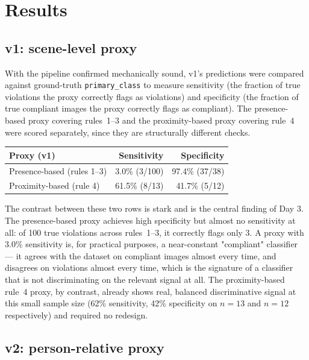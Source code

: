 \section{Results}

\subsection{v1: scene-level proxy}

With the pipeline confirmed mechanically sound, v1's predictions were compared against ground-truth
\texttt{primary\_class} to measure sensitivity (the fraction of true violations the proxy correctly
flags as violations) and specificity (the fraction of true compliant images the proxy correctly
flags as compliant). The presence-based proxy covering rules~1--3 and the proximity-based proxy
covering rule~4 were scored separately, since they are structurally different checks.

\begin{center}
\begin{tabular}{lrr}
\toprule
\textbf{Proxy (v1)} & \textbf{Sensitivity} & \textbf{Specificity} \\
\midrule
Presence-based (rules 1--3) & 3.0\% (3/100) & 97.4\% (37/38) \\
Proximity-based (rule 4) & 61.5\% (8/13) & 41.7\% (5/12) \\
\bottomrule
\end{tabular}
\end{center}

The contrast between these two rows is stark and is the central finding of Day 3. The
presence-based proxy achieves high specificity but almost no sensitivity at all: of 100 true
violations across rules~1--3, it correctly flags only 3. A proxy with 3.0\% sensitivity is, for
practical purposes, a near-constant "compliant" classifier --- it agrees with the dataset on
compliant images almost every time, and disagrees on violations almost every time, which is the
signature of a classifier that is not discriminating on the relevant signal at all. The
proximity-based rule~4 proxy, by contrast, already shows real, balanced discriminative signal at
this small sample size (62\% sensitivity, 42\% specificity on $n=13$ and $n=12$ respectively) and
required no redesign.

\subsection{v2: person-relative proxy}

